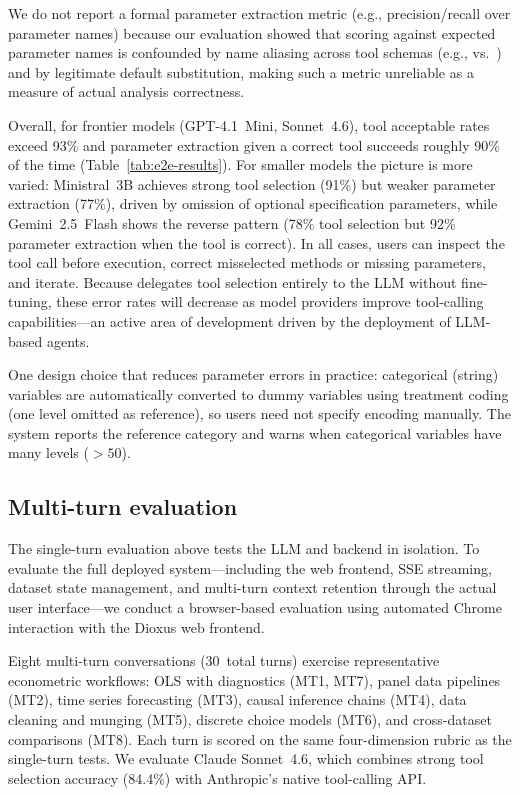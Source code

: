 We do not report a formal parameter extraction metric (e.g.,
precision/recall over parameter names) because our evaluation showed
that scoring against expected parameter names is confounded by name
aliasing across tool schemas (e.g.,  vs.\
) and by legitimate default substitution, making
such a metric unreliable as a measure of actual analysis correctness.

Overall, for frontier models (GPT-4.1~Mini, Sonnet~4.6), tool
acceptable rates exceed 93\% and parameter extraction given a correct
tool succeeds roughly 90\% of the time
(Table~\ref{tab:e2e-results}).  For smaller models the picture is
more varied: Ministral~3B achieves strong tool selection (91\%) but
weaker parameter extraction (77\%), driven by omission of optional
specification parameters, while Gemini~2.5~Flash shows the reverse
pattern (78\% tool selection but 92\% parameter extraction when the
tool is correct).  In all cases, users can inspect the tool call
before execution, correct misselected methods or missing parameters,
and iterate.  Because \pkg{prompt2analytics} delegates tool selection
entirely to the LLM without fine-tuning, these error rates will
decrease as model providers improve tool-calling capabilities---an
active area of development driven by the deployment of LLM-based
agents.

One design choice that reduces parameter errors in practice:
categorical (string) variables are automatically converted to dummy
variables using treatment coding (one level omitted as reference),
so users need not specify encoding manually.  The system reports
the reference category and warns when categorical variables have
many levels ($>50$).

\subsection{Multi-turn evaluation} \label{sec:e2e-eval}

The single-turn evaluation above tests the LLM and backend in isolation.
To evaluate the full deployed system---including the web frontend,
SSE streaming, dataset state management, and multi-turn context
retention through the actual user interface---we conduct a
browser-based evaluation using automated Chrome interaction with the
Dioxus web frontend.

Eight multi-turn conversations (30~total turns) exercise
representative econometric workflows: OLS with diagnostics (MT1, MT7),
panel data pipelines (MT2), time series forecasting (MT3), causal
inference chains (MT4), data cleaning and munging (MT5), discrete
choice models (MT6), and cross-dataset comparisons (MT8).  Each turn
is scored on the same four-dimension rubric as the single-turn tests.
We evaluate Claude Sonnet~4.6, which combines strong tool selection
accuracy (84.4\%) with Anthropic's native tool-calling API.

